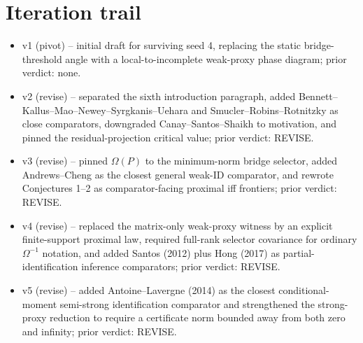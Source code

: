 \documentclass[11pt]{article}
\theoremstyle{definition}
\theoremstyle{plain}
\theoremstyle{remark}
\begin{document}
\section{Iteration trail}
\begin{itemize}[leftmargin=*]
\item v1 (pivot) -- initial draft for surviving seed 4, replacing the static
bridge-threshold angle with a local-to-incomplete weak-proxy phase diagram;
prior verdict: none.
\item v2 (revise) -- separated the sixth introduction paragraph, added
Bennett--Kallus--Mao--Newey--Syrgkanis--Uehara and
Smucler--Robins--Rotnitzky as close comparators, downgraded
Canay--Santos--Shaikh to motivation, and pinned the residual-projection
critical value; prior verdict: REVISE.
\item v3 (revise) -- pinned $\Omega(P)$ to the minimum-norm bridge selector,
added Andrews--Cheng as the closest general weak-ID comparator, and rewrote
Conjectures 1--2 as comparator-facing proximal iff frontiers; prior verdict:
REVISE.
\item v4 (revise) -- replaced the matrix-only weak-proxy witness by an
explicit finite-support proximal law, required full-rank selector covariance
for ordinary $\Omega^{-1}$ notation, and added Santos (2012) plus Hong (2017)
as partial-identification inference comparators; prior verdict: REVISE.
\item v5 (revise) -- added Antoine--Lavergne (2014) as the closest
conditional-moment semi-strong identification comparator and strengthened the
strong-proxy reduction to require a certificate norm bounded away from both
zero and infinity; prior verdict: REVISE.
\end{itemize}
\end{document}
